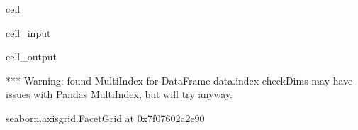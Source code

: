 \documentclass[letterpaper,table,10pt,english]{jupyterBook}
\begin{document}
\begin{sphinxuseclass}{cell}\begin{sphinxVerbatimInput}

\begin{sphinxuseclass}{cell_input}
\begin{sphinxVerbatim}[commandchars=\\\{\}]
  
     
                 
                     
\end{sphinxVerbatim}

\end{sphinxuseclass}\end{sphinxVerbatimInput}
\begin{sphinxVerbatimOutput}

\begin{sphinxuseclass}{cell_output}
\begin{sphinxVerbatim}[commandchars=\\\{\}]
*** Warning: found MultiIndex for DataFrame data.index \PYGZhy{} checkDims may have issues with Pandas MultiIndex, but will try anyway.
\end{sphinxVerbatim}

\begin{sphinxVerbatim}[commandchars=\\\{\}]
\PYGZlt{}seaborn.axisgrid.FacetGrid at 0x7f07602a2e90\PYGZgt{}
\end{sphinxVerbatim}

\noindent{}

\end{sphinxuseclass}\end{sphinxVerbatimOutput}

\end{sphinxuseclass}
\end{document}
